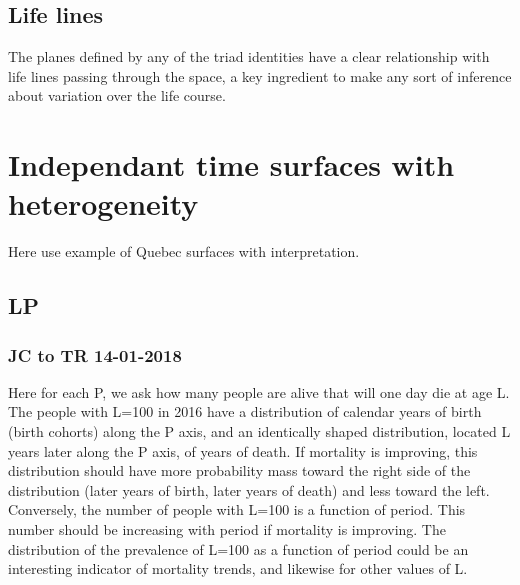 \subsection{Life lines}
The planes defined by any of the triad identities have a clear relationship with
life lines passing through the space, a key ingredient to make any sort of
inference about variation over the life course. 


\section{Independant time surfaces with heterogeneity}
Here use example of Quebec surfaces with interpretation.
\subsection{LP}

\subsubsection{JC to TR 14-01-2018}
Here for each P, we ask how many people are alive that will one day die at age
L. The people with L=100 in 2016 have a distribution of calendar years
of birth (birth cohorts) along the P axis, and an identically shaped
distribution, located L years later along the P axis, of years of
death. If mortality is improving, this distribution should have more
probability mass toward the right side of the distribution (later
years of birth, later years of death) and less toward the left.
Conversely, the number of people with L=100 is a function of period.
This number should be increasing with period if mortality is
improving. The distribution of the prevalence of L=100 as a function
of period could be an interesting indicator of mortality trends, and
likewise for other values of L.

